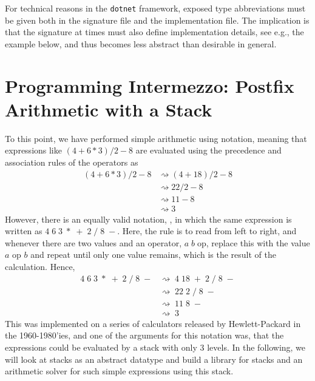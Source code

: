 \documentclass[fsharpNotes.tex]{subfiles}
\begin{document}
For technical reasons in the  \lstinline[language=console]{dotnet} framework, exposed type abbreviations must be given both in the signature file and the implementation file. The implication is that the signature at times must also define implementation details, see e.g., the example below, and thus becomes less abstract than desirable in general.

\section{Programming Intermezzo: Postfix Arithmetic with a Stack}
\label{sec:stack}
To this point, we have performed simple arithmetic using  notation, meaning that expressions like $(4+6*3)/2-8$ are evaluated using the precedence and association rules of the operators as
\begin{align}
  (4+6*3)/2-8
  &\rightsquigarrow (4+18)/2-8\\
  &\rightsquigarrow 22/2-8\\
  &\rightsquigarrow 11-8\\
  &\rightsquigarrow 3
\end{align}
However, there is an equally valid notation, , in which the same expression is written as $4\; 6\; 3\; *\; +\; 2\; /\; 8\; -$. Here, the rule is to read from left to right, and whenever there are two values and an operator, $a\; b\; \text{op}$, replace this with the value $a \text{ op } b$ and repeat until only one value remains, which is the result of the calculation. Hence,
\begin{align}
  4\; 6\; 3\; *\; +\; 2\; /\; 8\; -
  &\rightsquigarrow\; 4\; 18\; +\; 2\; /\; 8\; -\\
  &\rightsquigarrow\; 22\; 2\; /\; 8\; -\\
  &\rightsquigarrow\; 11\; 8\; -\\
  &\rightsquigarrow\; 3
\end{align}
This was implemented on a series of calculators released by Hewlett-Packard in the 1960-1980'ies, and one of the arguments for this notation was, that the expressions could be evaluated by a stack with only 3 levels. In the following, we will look at stacks as an abstract datatype and build a library for stacks and an arithmetic solver for such simple expressions using this stack.
\end{document}
